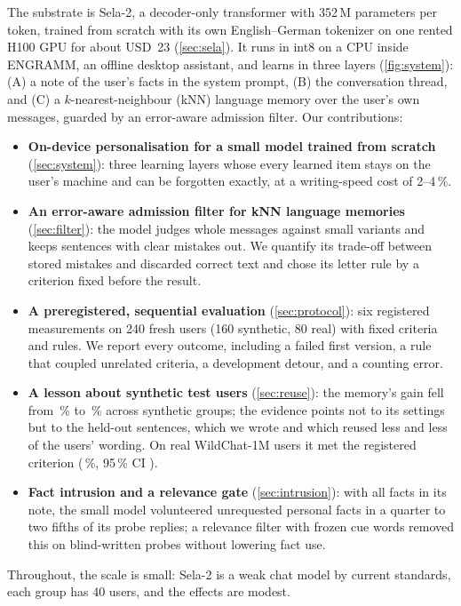 \documentclass[10pt,twocolumn]{article}
\newcommand{\pct}{\,\%}
\begin{document}
The substrate is Sela-2, a decoder-only transformer with 352\,M parameters per token, trained from scratch with its own
English--German tokenizer on one rented H100 GPU for about USD~23 (\cref{sec:sela}). It runs in int8 on a CPU inside
ENGRAMM, an offline desktop assistant, and learns in three layers (\cref{fig:system}): (A) a note of the user's facts in
the system prompt, (B) the conversation thread, and (C) a $k$-nearest-neighbour (kNN) language memory
\citep{khandelwal2020knnlm} over the user's own messages, guarded by an error-aware admission filter. Our contributions:
\begin{itemize}
\item \textbf{On-device personalisation for a small model trained from scratch} (\cref{sec:system}): three learning
layers whose every learned item stays on the user's machine and can be forgotten exactly, at a writing-speed cost of
2--4\pct.
\item \textbf{An error-aware admission filter for kNN language memories} (\cref{sec:filter}): the model judges whole
messages against small variants and keeps sentences with clear mistakes out. We quantify its trade-off between stored
mistakes and discarded correct text and chose its letter rule by a criterion fixed before the result.
\item \textbf{A preregistered, sequential evaluation} (\cref{sec:protocol}): six registered measurements on 240 fresh
users (160 synthetic, 80 real) with fixed criteria and rules. We report every outcome, including a failed first version,
a rule that coupled unrelated criteria, a development detour, and a counting error.
\item \textbf{A lesson about synthetic test users} (\cref{sec:reuse}): the memory's gain fell from \pct{} to
\pct{} across synthetic groups; the evidence points not to its settings but to the held-out sentences, which
we wrote and which reused less and less of the users' wording. On real WildChat-1M users \citep{zhao2024wildchat} it met the registered
criterion (\pct, 95\pct{} CI ).
\item \textbf{Fact intrusion and a relevance gate} (\cref{sec:intrusion}): with all facts in its note, the small model
volunteered unrequested personal facts in a quarter to two fifths of its probe replies; a relevance filter with frozen cue
words removed this on blind-written probes without lowering fact use.
\end{itemize}
Throughout, the scale is small: Sela-2 is a weak chat model by current standards, each group has 40 users, and the
effects are modest.
\end{document}
